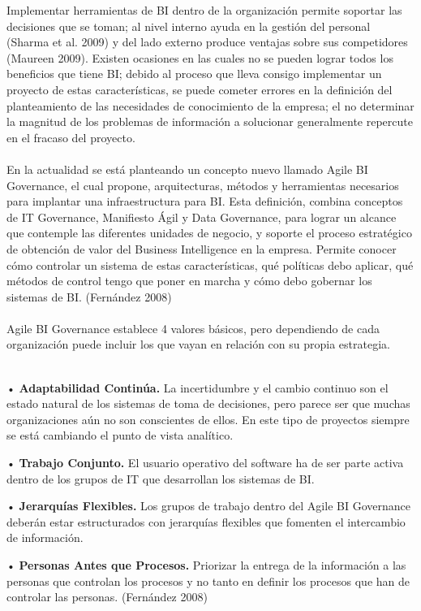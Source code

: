 \begin{flushleft}
Implementar herramientas de BI dentro de la organización permite soportar las decisiones que se toman; al nivel interno ayuda en la gestión del personal (Sharma et al. 2009) y del lado externo produce ventajas sobre sus competidores (Maureen 2009). Existen ocasiones en las cuales no se pueden lograr todos los beneficios que tiene BI; debido al proceso que lleva consigo implementar un proyecto de estas características, se puede cometer errores en la definición del planteamiento de las necesidades de conocimiento de la empresa; el no determinar la magnitud de los problemas de información a solucionar generalmente repercute en el fracaso del proyecto.\textbf{}\\
\textbf{}\\
En la actualidad se está planteando un concepto nuevo llamado Agile BI Governance, el cual propone, arquitecturas, métodos y herramientas necesarios para implantar una infraestructura para BI. Esta definición, combina conceptos de IT Governance, Manifiesto Ágil y Data Governance, para lograr un alcance que contemple las diferentes unidades de negocio, y soporte el proceso estratégico de obtención de valor del Business Intelligence en la empresa. Permite conocer cómo controlar un sistema de estas características, qué políticas debo aplicar, qué métodos de control tengo que poner en marcha y cómo debo gobernar los sistemas de BI. (Fernández 2008) \textbf{}\\
\textbf{}\\
Agile BI Governance establece 4 valores básicos, pero dependiendo de cada organización puede incluir los que vayan en relación con su propia estrategia. \textbf{}\\
\textbf{}\\
\item • \textbf{Adaptabilidad Continúa.} La incertidumbre y el cambio continuo son el estado natural de los sistemas de toma de decisiones, pero parece ser que muchas organizaciones aún no son conscientes de ellos. En este tipo de proyectos siempre se está cambiando el punto de vista analítico. \textbf{}\\
\item • \textbf{Trabajo Conjunto.}  El usuario operativo del software ha de ser parte activa dentro de los grupos de IT que desarrollan los sistemas de BI.\textbf{}\\
\item • \textbf{Jerarquías Flexibles.} Los grupos de trabajo dentro del Agile BI Governance deberán estar estructurados con jerarquías flexibles que fomenten el intercambio de información. \textbf{}\\
\item • \textbf{Personas Antes que Procesos.}  Priorizar la entrega de la información a las personas que controlan los procesos y no tanto en definir los procesos que han de controlar las personas. (Fernández 2008)


\end{flushleft}
